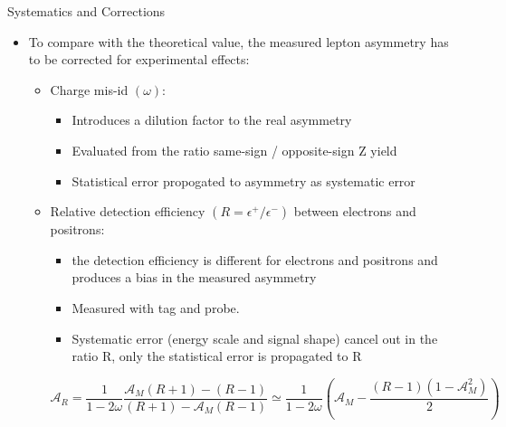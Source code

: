 \documentclass[t, 8pt]{beamer}
\begin{document}
\begin{frame}{Systematics and Corrections}
  \begin{itemize}
    \item To compare with the theoretical value, the measured lepton asymmetry has to be corrected for experimental effects:
    \begin{itemize}
      \item Charge mis-id $(\omega)$: 
      \begin{itemize}
        \item Introduces a dilution factor to the real asymmetry
        \item Evaluated from the ratio same-sign / opposite-sign Z yield
        \item Statistical error propogated to asymmetry as systematic error
      \end{itemize}
      \item Relative detection efficiency $(R = \epsilon^+/\epsilon^-)$ between electrons and positrons: 
      \begin{itemize}
        \item the detection efficiency is different for electrons and positrons and produces a bias in the measured asymmetry
        \item Measured with tag and probe.
        \item Systematic error (energy scale and signal shape) cancel out in the ratio R, only the statistical error is propagated to R
      \end{itemize}
      \begin{center}
      \begin{equation}
        \mathcal{A}_R=
          \frac{1}{1-2\omega}\frac{ \mathcal{A}_M\left(R+1\right) - \left(R-1\right)}{\left(R+1\right)-\mathcal{A}_M \left(R-1\right)}
          \simeq 
          \frac{1}{1-2\omega}\left(\mathcal{A}_M -\frac{\left(R-1\right)\left(1-\mathcal{A}_M^2\right)}{2}\right)
      \end{equation}
      \end{center}
    \end{itemize}
  \end{itemize}
\end{frame}
\end{document}
